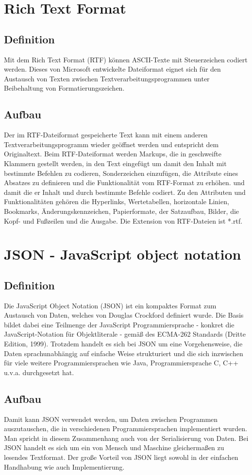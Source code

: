 \section{Rich Text Format}
	\subsection{Definition}
		Mit dem Rich Text Format (RTF) können ASCII-Texte mit Steuerzeichen codiert werden. Dieses von Microsoft entwickelte Dateiformat eignet sich für den Austausch von Texten zwischen Textverarbeitungsprogrammen unter Beibehaltung von Formatierungszeichen.
	\subsection{Aufbau}
		Der im RTF-Dateiformat gespeicherte Text kann mit einem anderen Textverarbeitungsprogramm wieder geöffnet werden und entspricht dem Originaltext.
		Beim RTF-Dateiformat werden Markups, die in geschweifte Klammern gestellt werden, in den Text eingefügt um damit den Inhalt mit bestimmte Befehlen zu codieren, Sonderzeichen einzufügen, die Attribute eines Absatzes zu definieren und die Funktionalität vom RTF-Format zu erhöhen. und damit die er Inhalt und durch bestimmte Befehle codiert.
		Zu den Attributen und Funktionalitäten gehören die Hyperlinks, Wertetabellen, horizontale Linien, Bookmarks, Änderungskennzeichen, Papierformate, der Satzaufbau, Bilder, die Kopf- und Fußzeilen und die Ausgabe.
		Die Extension von RTF-Dateien ist *.rtf.
		
\section{JSON - JavaScript object notation}
	\subsection{Definition}
		Die JavaScript Object Notation (JSON) ist ein kompaktes Format zum Austausch von Daten, welches von Douglas Crockford definiert wurde. Die Basis bildet dabei eine Teilmenge der JavaScript Programmiersprache - konkret die JavaScript-Notation für Objektliterale - gemäß des ECMA-262 Standards (Dritte Edition, 1999). Trotzdem handelt es sich bei JSON um eine Vorgehensweise, die Daten sprachunabhängig auf einfache Weise strukturiert und die sich inzwischen für viele weitere Programmiersprachen wie Java, Programmiersprache C, C++ u.v.a. durchgesetzt hat.
	\subsection{Aufbau}
		Damit kann JSON verwendet werden, um Daten zwischen Programmen auszutauschen, die in verschiedenen Programmiersprachen implementiert wurden. Man spricht in diesem Zusammenhang auch von der Serialisierung von Daten. Bei JSON handelt es sich um ein von Mensch und Maschine gleichermaßen zu lesendes Textformat. Der große Vorteil von JSON liegt sowohl in der einfachen Handhabung wie auch Implementierung.
